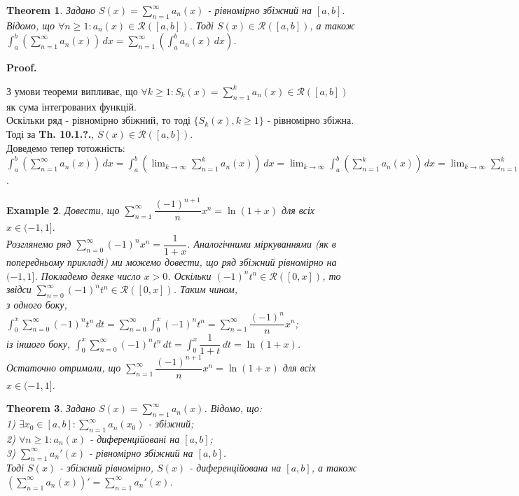 \documentclass[a4paper, 10pt]{article}
\makeatletter
\def\huge{\displaystyle}
\def\qed{$\blacksquare$}
\theoremstyle{theoremdd}
\newtheorem{theorem}{Theorem}[subsection]
\theoremstyle{theoremdd}
\theoremstyle{theoremdd}
\theoremstyle{theoremdd}
\theoremstyle{theoremdd}
\newtheorem{example}[theorem]{Example}
\theoremstyle{theoremdd}
\theoremstyle{theoremdd}
\theoremstyle{theoremdd}
\theoremstyle{theoremdd}
\renewenvironment{proof}[1][Proof.\\]{\par
\pushQED{\hfill \qed}%
\normalfont \topsep6\p@\@plus6\p@\relax
\trivlist
\item\relax
{\bfseries
#1\@addpunct{.}}\hspace\labelsep\ignorespaces
}{%
\popQED\endtrivlist\@endpefalse
}
\makeatother
\begin{document}
\begin{theorem}
Задано $S(x) = \huge \sum_{n=1}^\infty a_n(x)$ - рівномірно збіжний на $[a,b]$.\\
Відомо, що $\forall n \geq 1: a_n(x) \in \mathcal{R}([a,b])$. Тоді $S(x) \in \mathcal{R}([a,b])$, а також\\
$\huge \int_a^b \left( \sum_{n=1}^\infty a_n(x) \right) \,dx = \sum_{n=1}^\infty \left( \int_a^b a_n(x)\,dx \right)$.
\end{theorem}

\begin{proof}
З умови теореми випливає, що $\forall k \geq 1: S_k(x) = \huge \sum_{n=1}^k a_n(x) \in \mathcal{R}([a,b])$ як сума інтегрованих функцій.\\
Оскільки ряд - рівномірно збіжний, то тоді $\{S_k(x), k \geq 1\}$ - рівномірно збіжна. Тоді за \textbf{Th. 10.1.?.}, $S(x) \in \mathcal{R}([a,b])$.\\
Доведемо тепер тотожність:\\
$\huge \int_a^b \left( \sum_{n=1}^\infty a_n(x) \right) \,dx = \int_a^b \left( \lim_{k \to \infty} \sum_{n=1}^k a_n(x) \right) \,dx = \lim_{k \to \infty} \int_a^b \left( \sum_{n=1}^k a_n(x) \right) \,dx = \lim_{k \to \infty} \sum_{n=1}^k \left( \int_a^b a_n(x)\,dx \right) = \sum_{n=1}^\infty \left( \int_a^b a_n(x)\,dx \right)$.
\end{proof}

\begin{example}
Довести, що $\huge\sum_{n=1}^\infty \dfrac{(-1)^{n+1}}{n}x^n = \ln (1+x)$ для всіх $x \in (-1,1]$.\\
Розглянемо ряд $\huge\sum_{n=0}^\infty (-1)^n x^n = \dfrac{1}{1+x}$. Аналогічними міркуваннями (як в попередньому прикладі) ми можемо довести, що ряд збіжний рівномірно на $(-1,1]$. Покладемо деяке число $x > 0$. Оскільки $(-1)^n t^n \in \mathcal{R}([0,x])$, то звідси $\huge\sum_{n=0}^\infty (-1)^n t^n \in \mathcal{R}([0,x])$. Таким чином,\\
з одного боку, $\huge\int_0^x \huge\sum_{n=0}^\infty (-1)^n t^n \,dt = \sum_{n=0}^\infty \int_0^x (-1)^n t^n = \sum_{n=1}^\infty \dfrac{(-1)^n}{n}x^n$;\\
із іншого боку, $\huge\int_0^x \huge\sum_{n=0}^\infty (-1)^n t^n \,dt = \int_0^x \dfrac{1}{1+t}\,dt = \ln (1+x)$.\\
Остаточно отримали, що $\huge\sum_{n=1}^\infty \dfrac{(-1)^{n+1}}{n}x^n = \ln (1+x)$ для всіх $x \in (-1,1]$.
\end{example}

\begin{theorem}
Задано $S(x) = \huge \sum_{n=1}^\infty a_n(x)$. Відомо, що:\\
1) $\exists x_0 \in [a,b]: \huge \sum_{n=1}^\infty a_n(x_0)$ - збіжний;\\
2) $\forall n \geq 1: a_n(x)$ - диференційовані на $[a,b]$;\\
3) $\huge \sum_{n=1}^\infty a_n'(x)$ - рівномірно збіжний на $[a,b]$.\\
Тоді $S(x)$ - збіжний рівномірно, $S(x)$ - диференційована на $[a,b]$, а також $\huge \left(  \sum_{n=1}^\infty a_n(x) \right)' = \sum_{n=1}^\infty a_n'(x)$.
\end{theorem}
\end{document}
